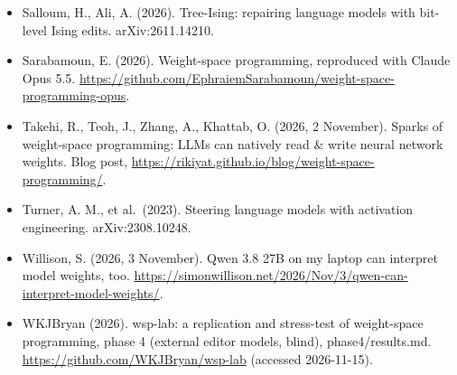\documentclass[
  10pt,
]{article}
\begin{document}
\begin{itemize}
  weight-space programming too.
  \url{https://github.com/Prayas-Agrawal/weight-whisperer}.
\item
  Salloum, H., Ali, A. (2026). Tree-Ising: repairing language models
  with bit-level Ising edits. arXiv:2611.14210.
\item
  Sarabamoun, E. (2026). Weight-space programming, reproduced with
  Claude Opus 5.5.
  \url{https://github.com/EphraiemSarabamoun/weight-space-programming-opus}.
\item
  Takehi, R., Teoh, J., Zhang, A., Khattab, O. (2026, 2 November).
  Sparks of weight-space programming: LLMs can natively read \& write
  neural network weights. Blog post,
  \url{https://rikiyat.github.io/blog/weight-space-programming/}.
\item
  Turner, A. M., et al.~(2023). Steering language models with activation
  engineering. arXiv:2308.10248.
\item
  Willison, S. (2026, 3 November). Qwen 3.8 27B on my laptop can
  interpret model weights, too.
  \url{https://simonwillison.net/2026/Nov/3/qwen-can-interpret-model-weights/}.
\item
  WKJBryan (2026). wsp-lab: a replication and stress-test of
  weight-space programming, phase 4 (external editor models, blind),
  phase4/results.md. \url{https://github.com/WKJBryan/wsp-lab} (accessed
  2026-11-15).
\end{itemize}
\end{document}
